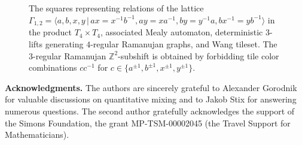 \documentclass[12pt]{article}
\theoremstyle{definition}
\begin{document}
\begin{figure}[p]
\begin{minipage}[b]{0.5\textwidth}
\begin{center}
\hspace{-1.3cm}\hspace{1.1cm} \  \hspace{1.1cm} \  \hspace{1.1cm} \  \hspace{1.1cm} \  \\[0.8cm]
\hspace{-1.3cm}\hspace{1.1cm} \  \hspace{1.1cm} \  \hspace{1.1cm} \  \hspace{1.1cm} \  \\[0.8cm]
\hspace{-1.3cm}\hspace{1.1cm} \  \hspace{1.1cm} \  \hspace{1.1cm} \  \hspace{1.1cm} \  \\[0.8cm]
\hspace{-1.3cm}\hspace{1.1cm} \  \hspace{1.1cm} \  \hspace{1.1cm} \  \hspace{1.1cm} \  \\[0.8cm]
\end{center}
\end{minipage}
\vspace{1.5cm}
\caption{The squares representing relations of the lattice $\Gamma_{1,2}=\langle a,b,x,y\,|\, ax=x^{-1}b^{-1}, ay=xa^{-1}, by=y^{-1}a, bx^{-1}=yb^{-1}\rangle$ in the product $T_4\times T_4$, associated Mealy automaton, deterministic $3$-lifts generating $4$-regular Ramanujan graphs, and Wang tileset. The $3$-regular Ramanujan $\mathbb{Z}^2$-subshift is obtained by forbidding tile color combinations $cc^{-1}$ for $c\in\{a^{\pm 1},b^{\pm 1}, x^{\pm 1}, y^{\pm 1}\}$.}
\label{fig:Example1_p=3}
\end{figure}


\vspace{0.2cm}
\textbf{Acknowledgments.} 
The authors are sincerely grateful to Alexander Gorodnik for valuable discussions on quantitative mixing and to Jakob Stix for answering numerous questions. The second author gratefully acknowledges the support of the Simons Foundation, the grant MP-TSM-00002045 (the Travel Support for Mathematicians).
\end{document}
